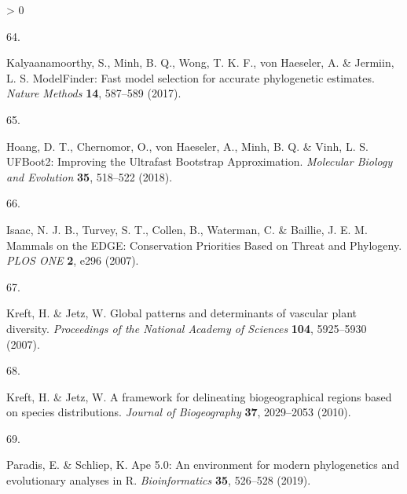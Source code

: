 \documentclass[11pt]{article}
\newlength{\cslhangindent}
\newlength{\csllabelwidth}
\newenvironment{CSLReferences}[3] %
 {%
  \setlength{\parindent}{0pt}
  \ifodd #1 \everypar{\setlength{\hangindent}{\cslhangindent}}\ignorespaces\fi
  \ifnum #2 > 0
  \setlength{\parskip}{#2\baselineskip}
  \fi
 }%
 {}
\newcommand{\CSLLeftMargin}[1]{\parbox[t]{\maxof{\widthof{#1}}{\csllabelwidth}}{#1}}
\newcommand{\CSLRightInline}[1]{\parbox[t]{\linewidth}{#1}}
\begin{document}
\begin{CSLReferences}{0}{0}
\leavevmode\hypertarget{ref-Kalyaanamoorthy2017ModFas}{}%
\CSLLeftMargin{64. }
\CSLRightInline{Kalyaanamoorthy, S., Minh, B. Q., Wong, T. K. F., von
Haeseler, A. \& Jermiin, L. S. ModelFinder: Fast model selection for
accurate phylogenetic estimates. \emph{Nature Methods} \textbf{14},
587--589 (2017).}

\leavevmode\hypertarget{ref-Hoang2018UfbImp}{}%
\CSLLeftMargin{65. }
\CSLRightInline{Hoang, D. T., Chernomor, O., von Haeseler, A., Minh, B.
Q. \& Vinh, L. S. UFBoot2: Improving the Ultrafast Bootstrap
Approximation. \emph{Molecular Biology and Evolution} \textbf{35},
518--522 (2018).}

\leavevmode\hypertarget{ref-Isaac2007MamEdg}{}%
\CSLLeftMargin{66. }
\CSLRightInline{Isaac, N. J. B., Turvey, S. T., Collen, B., Waterman, C.
\& Baillie, J. E. M. Mammals on the EDGE: Conservation Priorities Based
on Threat and Phylogeny. \emph{PLOS ONE} \textbf{2}, e296 (2007).}

\leavevmode\hypertarget{ref-Kreft2007GloPat}{}%
\CSLLeftMargin{67. }
\CSLRightInline{Kreft, H. \& Jetz, W. Global patterns and determinants
of vascular plant diversity. \emph{Proceedings of the National Academy
of Sciences} \textbf{104}, 5925--5930 (2007).}

\leavevmode\hypertarget{ref-Kreft2010FraDel}{}%
\CSLLeftMargin{68. }
\CSLRightInline{Kreft, H. \& Jetz, W. A framework for delineating
biogeographical regions based on species distributions. \emph{Journal of
Biogeography} \textbf{37}, 2029--2053 (2010).}

\leavevmode\hypertarget{ref-Paradis2019ApeEnv}{}%
\CSLLeftMargin{69. }
\CSLRightInline{Paradis, E. \& Schliep, K. Ape 5.0: An environment for
modern phylogenetics and evolutionary analyses in R.
\emph{Bioinformatics} \textbf{35}, 526--528 (2019).}

\end{CSLReferences}
\end{document}
